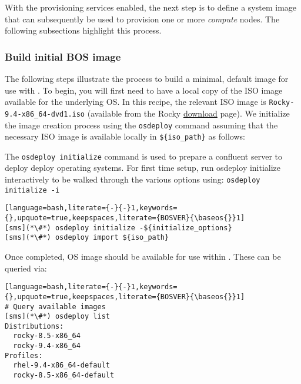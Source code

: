
With the provisioning services enabled, the next step is to define
a system image that can subsequently be
used to provision one or more {\em compute} nodes. The following subsections highlight this process.

\subsubsection{Build initial BOS image} \label{sec:assemble_bos}
The following steps illustrate the process to build a minimal, default image for use with \Confluent{}. To begin, you will
first need to have a local copy of the ISO image available for the underlying OS. In this recipe, the relevant ISO image
is \texttt{Rocky-9.4-x86\_64-dvd1.iso} (available from the Rocky
\href{https://rockylinux.org/download/}{\color{blue}download} page).
We initialize the image
creation process using the \texttt{osdeploy} command assuming that the necessary ISO image is available locally in
\texttt{\$\{iso\_path\}} as follows:

The \texttt{osdeploy initialize} command is used to prepare a confluent server to deploy deploy operating systems.
For first time setup, run osdeploy initialize interactively to be walked through the various options using: 
\texttt{osdeploy initialize -i}

\begin{lstlisting}[language=bash,literate={-}{-}1,keywords={},upquote=true,keepspaces,literate={BOSVER}{\baseos{}}1]
[sms](*\#*) osdeploy initialize -${initialize_options}
[sms](*\#*) osdeploy import ${iso_path}

\end{lstlisting}

\noindent Once completed, OS image should be available for use within \Confluent{}. These can be queried via:

\begin{lstlisting}[language=bash,literate={-}{-}1,keywords={},upquote=true,keepspaces,literate={BOSVER}{\baseos{}}1]
# Query available images
[sms](*\#*) osdeploy list
Distributions:
  rocky-8.5-x86_64
  rocky-9.4-x86_64
Profiles:
  rhel-9.4-x86_64-default
  rocky-8.5-x86_64-default
\end{lstlisting}


